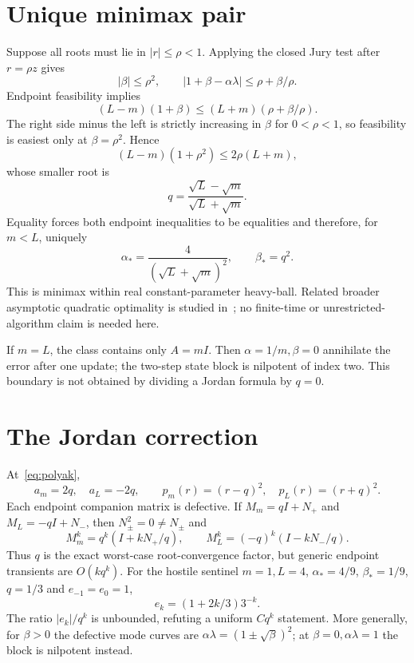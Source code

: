 \documentclass[9pt]{extarticle}
\begin{document}
\section{Unique minimax pair}
Suppose all roots must lie in $|r|\le\rho<1$.  Applying the closed Jury test
after $r=\rho z$ gives
\begin{equation}\label{eq:disk}
 |\beta|\le\rho^2,\qquad
 |1+\beta-\alpha\lambda|\le\rho+\beta/\rho.
\end{equation}
Endpoint feasibility implies
\begin{equation}\label{eq:necessary}
 (L-m)(1+\beta)\le(L+m)(\rho+\beta/\rho).
\end{equation}
The right side minus the left is strictly increasing in $\beta$ for
$0<\rho<1$, so feasibility is easiest only at $\beta=\rho^2$.  Hence
\[
 (L-m)(1+\rho^2)\le2\rho(L+m),
\]
whose smaller root is
\[
 q=\frac{\sqrt L-\sqrt m}{\sqrt L+\sqrt m}.
\]
Equality forces both endpoint inequalities to be equalities and therefore,
for $m<L$, uniquely
\begin{equation}\label{eq:polyak}
 \boxed{\alpha_*=\frac{4}{(\sqrt L+\sqrt m)^2},\qquad
 \beta_*=q^2.}
\end{equation}
This is minimax within real constant-parameter heavy-ball.  Related broader
asymptotic quadratic optimality is studied in~\cite{UPS23}; no finite-time or
unrestricted-algorithm claim is needed here.

If $m=L$, the class contains only $A=mI$.  Then $\alpha=1/m,\beta=0$
annihilate the error after one update; the two-step state block is nilpotent of
index two.  This boundary is not obtained by dividing a Jordan formula by
$q=0$.

\section{The Jordan correction}
At~\eqref{eq:polyak},
\[
 a_m=2q,\quad a_L=-2q,\qquad
 p_m(r)=(r-q)^2,\quad p_L(r)=(r+q)^2.
\]
Each endpoint companion matrix is defective.  If $M_m=qI+N_+$ and
$M_L=-qI+N_-$, then $N_\pm^2=0\ne N_\pm$ and
\[
 M_m^k=q^k(I+kN_+/q),\qquad
 M_L^k=(-q)^k(I-kN_-/q).
\]
Thus $q$ is the exact worst-case root-convergence factor, but generic endpoint
transients are $O(kq^k)$.  For the hostile sentinel $m=1,L=4$,
$\alpha_*=4/9$, $\beta_*=1/9$, $q=1/3$ and $e_{-1}=e_0=1$,
\begin{equation}\label{eq:counter}
 e_k=(1+2k/3)3^{-k}.
\end{equation}
The ratio $|e_k|/q^k$ is unbounded, refuting a uniform $Cq^k$ statement.
More generally, for $\beta>0$ the defective mode curves are
$\alpha\lambda=(1\pm\sqrt\beta)^2$; at $\beta=0,\alpha\lambda=1$ the block is
nilpotent instead.
\fi
\end{document}

